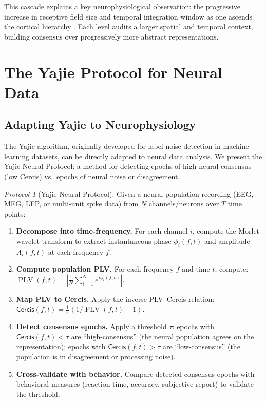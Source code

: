 \documentclass[12pt,a4paper]{article}
\theoremstyle{remark}
\newtheorem{protocol}[theorem]{Protocol}
\newcommand{\Cercis}{\textsf{Cercis}}
\newcommand{\Yajie}{\textsf{Yajie}}
\DeclareMathOperator{\PLV}{PLV}
\begin{document}
This cascade explains a key neurophysiological observation: the progressive
increase in receptive field size and temporal integration window as one
ascends the cortical hierarchy \cite{hasson2015hierarchical, lerner2011topographic}.
Each level audits a larger spatial and temporal context, building consensus
over progressively more abstract representations.

\section{The Yajie Protocol for Neural Data}
\label{sec:yajie-neural}

\subsection{Adapting Yajie to Neurophysiology}

The \Yajie{} algorithm, originally developed for label noise detection in
machine learning datasets, can be directly adapted to neural data analysis.
We present the \Yajie{} Neural Protocol: a method for detecting epochs of
high neural consensus (low \Cercis{}) vs.\ epochs of neural noise or
disagreement.

\begin{protocol}[Yajie Neural Protocol]\label{prot:yajie-neural}
Given a neural population recording (EEG, MEG, LFP, or multi-unit spike data)
from $N$ channels/neurons over $T$ time points:

\begin{enumerate}[label=\textbf{Step \arabic*}, leftmargin=*]
    \item \textbf{Decompose into time-frequency.} For each channel $i$, compute
    the Morlet wavelet transform to extract instantaneous phase $\phi_i(f, t)$
    and amplitude $A_i(f, t)$ at each frequency $f$.
    \item \textbf{Compute population PLV.} For each frequency $f$ and time $t$,
    compute: $\PLV(f, t) = |\frac{1}{N}\sum_{i=1}^{N} e^{i\phi_i(f, t)}|$.
    \item \textbf{Map PLV to Cercis.} Apply the inverse PLV--Cercis relation:
    $\Cercis(f, t) = \frac{1}{\kappa}(1/\PLV(f, t) - 1)$.
    \item \textbf{Detect consensus epochs.} Apply a threshold $\tau$: epochs
    with $\Cercis(f, t) < \tau$ are ``high-consensus'' (the neural population
    agrees on the representation); epochs with $\Cercis(f, t) > \tau$ are
    ``low-consensus'' (the population is in disagreement or processing noise).
    \item \textbf{Cross-validate with behavior.} Compare detected consensus
    epochs with behavioral measures (reaction time, accuracy, subjective report)
    to validate the threshold.
\end{enumerate}
\end{protocol}
\end{document}

